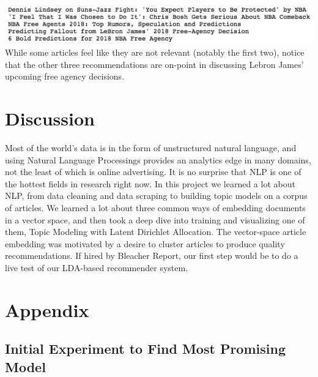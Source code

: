 \documentclass[11pt]{article}
\begin{document}
 \includegraphics{preds.png}\\
 
 While some articles feel like they are not relevant (notably the first two), notice that the other three recommendations are on-point in discussing Lebron James' upcoming free agency decisions. 

\section{Discussion}
Most of the world's data is in the form of unstructured natural language, and using Natural Language Processings provides an analytics edge in many domains, not the least of which is online advertising.  It is no surprise that NLP is one of the hottest fields in research right now.  In this project we learned a lot about NLP, from data cleaning and data scraping to building topic models on a corpus of articles.  We learned a lot about three common ways of embedding documents in a vector space, and then took a deep dive into training and visualizing one of them, Topic Modeling with Latent Dirichlet Allocation. The vector-space article embedding was motivated by a desire to cluster articles to produce quality recommendations.  If hired by Bleacher Report, our first step would be to do a live test of our LDA-based recommender system.  

\section{Appendix}
\subsection{Initial Experiment to Find Most Promising Model}
\end{document}

